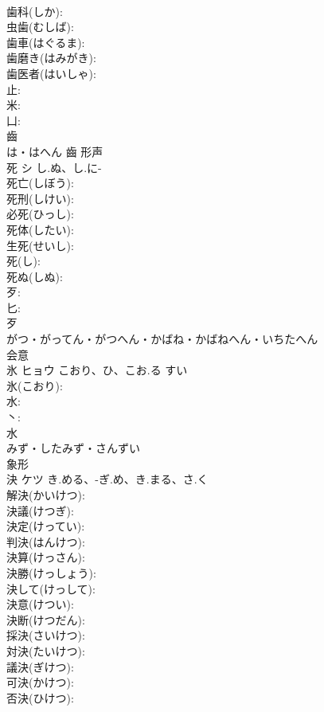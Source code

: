 \documentclass[8pt]{extreport}
\begin{document}
\begin{CJK}{UTF8}{min}
\\	歯科(しか): 
\\	虫歯(むしば): 
\\	歯車(はぐるま): 
\\	歯磨き(はみがき): 
\\	歯医者(はいしゃ): 
\\	止: 
\\	米: 
\\	凵: 
\\	齒	
\\	は・はへん	齒	形声 
\\	死	シ	し.ぬ、し.に-		
\\	死亡(しぼう): 
\\	死刑(しけい): 
\\	必死(ひっし): 
\\	死体(したい): 
\\	生死(せいし): 
\\	死(し): 
\\	死ぬ(しぬ): 
\\	歹: 
\\	匕: 
\\	歹	
\\	がつ・がってん・がつへん・かばね・かばねへん・いちたへん	
\\	会意 
\\	氷	ヒョウ	こおり、ひ、こお.る	すい	
\\	氷(こおり): 
\\	水: 
\\	丶: 
\\	水	
\\	みず・したみず・さんずい	
\\	象形 
\\	決	ケツ	き.める、-ぎ.め、き.まる、さ.く		
\\	解決(かいけつ): 
\\	決議(けつぎ): 
\\	決定(けってい): 
\\	判決(はんけつ): 
\\	決算(けっさん): 
\\	決勝(けっしょう): 
\\	決して(けっして): 
\\	決意(けつい): 
\\	決断(けつだん): 
\\	採決(さいけつ): 
\\	対決(たいけつ): 
\\	議決(ぎけつ): 
\\	可決(かけつ): 
\\	否決(ひけつ): 

\end{CJK}
\end{document}
